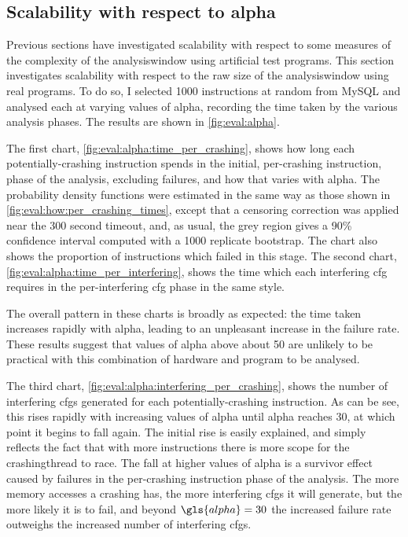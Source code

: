 \subsection{Scalability with respect to \gls{alpha}}



\noindent
Previous sections have investigated scalability with respect to some
measures of the complexity of the \gls{analysiswindow} using
artificial test programs.  This section investigates scalability with
respect to the raw size of the \gls{analysiswindow} using real
programs.  To do so, I selected 1000 instructions at random from MySQL
and analysed each at varying values of \gls{alpha}, recording the time
taken by the various analysis phases.  The results are shown in
\autoref{fig:eval:alpha}.

The first chart, \autoref{fig:eval:alpha:time_per_crashing}, shows how
long each potentially-crashing instruction spends in the initial,
per-crashing instruction, phase of the analysis, excluding failures,
and how that varies with \gls{alpha}.  The probability density
functions were estimated in the same way as those shown in
\autoref{fig:eval:how:per_crashing_times}, except that a censoring
correction was applied near the 300 second timeout, and, as usual, the
grey region gives a 90\% confidence interval computed with a 1000
replicate bootstrap.  The chart also shows the proportion of
instructions which failed in this stage.  The second chart,
\autoref{fig:eval:alpha:time_per_interfering}, shows the time which
each interfering \gls{cfg} requires in the per-interfering \gls{cfg}
phase in the same style.

The overall pattern in these charts is broadly as expected: the time
taken increases rapidly with \gls{alpha}, leading to an unpleasant
increase in the failure rate.  These results suggest that values of
\gls{alpha} above about 50 are unlikely to be practical with this
combination of hardware and program to be analysed.

The third chart, \autoref{fig:eval:alpha:interfering_per_crashing},
shows the number of interfering \glspl{cfg} generated for each
potentially-crashing instruction.  As can be see, this rises rapidly
with increasing values of \gls{alpha} until \gls{alpha} reaches 30, at
which point it begins to fall again.  The initial rise is easily
explained, and simply reflects the fact that with more instructions
there is more scope for the \gls{crashingthread} to race.  The fall at
higher values of \gls{alpha} is a survivor effect caused by failures
in the per-crashing instruction phase of the analysis.  The more
memory accesses a crashing {\StateMachine} has, the more interfering
\glspl{cfg} it will generate, but the more likely it is to fail, and
beyond $\gls{alpha}=30$ the increased failure rate outweighs the
increased number of interfering \glspl{cfg}.

